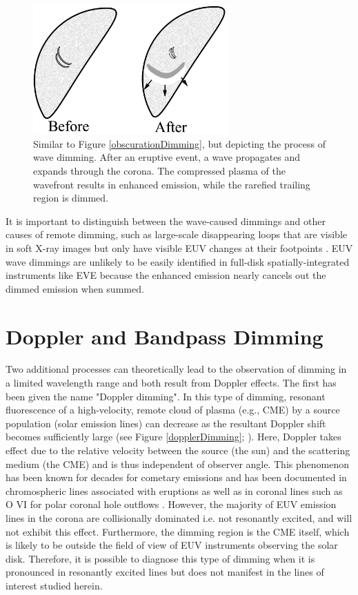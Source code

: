 \begin{figure}[!h]
    \begin{center}
        \includegraphics[width=75mm]{Images/WaveDimming.png}
    \end{center}
    \caption[Schematic of obscuration dimming]{
        Similar to Figure \ref{obscurationDimming}, but depicting the process of wave dimming. After an eruptive event, a 
        wave propagates and expands through the corona. The compressed plasma of the wavefront results in enhanced emission,
        while the rarefied trailing region is dimmed. 
    }
    \label{waveDimming}
\end{figure}

It is important to distinguish between the wave-caused dimmings and other causes of remote dimming, such as large-scale disappearing loops that are visible in soft X-ray images but only have visible EUV changes at their footpoints \citep{Pohjolainen2005}. EUV wave dimmings are unlikely to be easily identified in full-disk spatially-integrated instruments like EVE because the enhanced emission nearly cancels out the dimmed emission when summed. 

\section{Doppler and Bandpass Dimming}
Two additional processes can theoretically lead to the observation of dimming in a limited wavelength range and both result from Doppler effects. The first has been given the name "Doppler dimming". In this type of dimming, resonant fluorescence of a high-velocity, remote cloud of plasma (e.g., CME) by a source population (solar emission lines) can decrease as the resultant Doppler shift becomes sufficiently large (see Figure \ref{dopplerDimming}; \citealt{Hyder1970}). Here, Doppler takes effect due to the relative velocity between the source (the sun) and the scattering medium (the CME) and is thus independent of observer angle. This phenomenon has been known for decades for cometary emissions \citep{Swings1941, Greenstein1958} and has been documented in chromospheric lines associated with eruptions \citep{Labrosse2012} as well as in coronal lines such as O VI for polar coronal hole outflows \citep{Giordano2000}. However, the majority of EUV emission lines in the corona are collisionally dominated i.e. not resonantly excited, and will not exhibit this effect. Furthermore, the dimming region is the CME itself, which is likely to be outside the field of view of EUV instruments observing the solar disk. Therefore, it is possible to diagnose this type of dimming when it is pronounced in resonantly excited lines but does not manifest in the lines of interest studied herein. 

